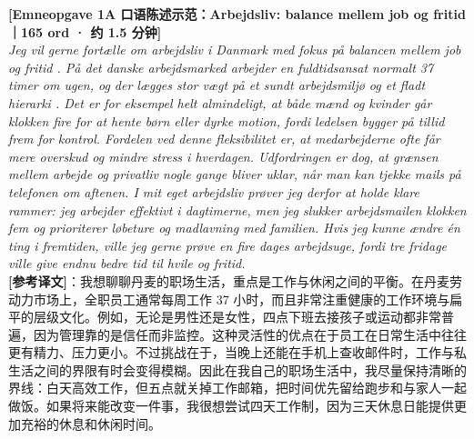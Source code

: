\begin{transbox}
\small
\textbf{\color{NCDNavy}[Emneopgave 1A 口语陈述示范：Arbejdsliv: balance mellem job og fritid｜165 ord · 约 1.5 分钟]}\\
\textit{Jeg vil gerne fortælle om arbejdsliv i Danmark med fokus på balancen mellem job og fritid . På det danske arbejdsmarked arbejder en fuldtidsansat normalt 37 timer om ugen, og der lægges stor vægt på et sundt arbejdsmiljø og et fladt hierarki . Det er for eksempel helt almindeligt, at både mænd og kvinder går klokken fire for at hente børn eller dyrke motion, fordi ledelsen bygger på tillid  frem for kontrol. Fordelen ved denne fleksibilitet er, at medarbejderne ofte får mere overskud og mindre stress i hverdagen. Udfordringen  er dog, at grænsen mellem arbejde og privatliv nogle gange bliver uklar, når man kan tjekke mails på telefonen om aftenen. I mit eget arbejdsliv prøver jeg derfor at holde klare rammer: jeg arbejder effektivt i dagtimerne, men jeg slukker arbejdsmailen klokken fem og prioriterer løbeture og madlavning med familien. Hvis jeg kunne ændre én ting i fremtiden, ville jeg gerne prøve en fire dages arbejdsuge, fordi tre fridage ville give endnu bedre tid til hvile og fritid.}\\[4pt]
\textbf{\color{NCDTeal}[参考译文]}：我想聊聊丹麦的职场生活，重点是工作与休闲之间的平衡。在丹麦劳动力市场上，全职员工通常每周工作 37 小时，而且非常注重健康的工作环境与扁平的层级文化。例如，无论是男性还是女性，四点下班去接孩子或运动都非常普遍，因为管理靠的是信任而非监控。这种灵活性的优点在于员工在日常生活中往往更有精力、压力更小。不过挑战在于，当晚上还能在手机上查收邮件时，工作与私生活之间的界限有时会变得模糊。因此在我自己的职场生活中，我尽量保持清晰的界线：白天高效工作，但五点就关掉工作邮箱，把时间优先留给跑步和与家人一起做饭。如果将来能改变一件事，我很想尝试四天工作制，因为三天休息日能提供更加充裕的休息和休闲时间。
\end{transbox}

